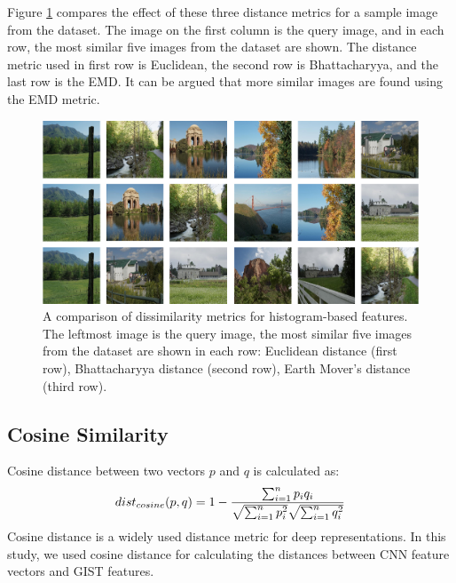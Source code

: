 Figure \ref{fig:sim_comp} compares the effect of these three distance
metrics for a sample image from the dataset. The image
on the first column is the query image, and in each row,
the most similar five images from the dataset are shown.
The distance metric used in first row is Euclidean, the
second row is Bhattacharyya, and the last row is the
EMD. It can be argued that more similar images are
found using the EMD metric.

\begin{figure} 
\centering
\caption{A comparison of dissimilarity metrics for histogram-based features. The leftmost image is the query image, the most similar five images from the dataset are shown in each row: Euclidean distance (first row), Bhattacharyya distance (second row), Earth Mover’s distance (third row).}
\label{fig:sim_comp}
\includegraphics[width=\textwidth]{figures/chapter2/16sims.png}
\vspace{10pt}
\end{figure}

\subsection{Cosine Similarity}
Cosine distance between two vectors $p$ and $q$ is calculated as:
\begin{equation}
dist_{cosine}(p,q) = 1 - {{\sum_{i=1}^{n}p_{i}q_{i}} \over {\sqrt{\sum_{i=1}^{n}p_{i}^2}} \sqrt{\sum_{i=1}^{n}q_{i}^2}} 
\end{equation}
Cosine distance is a widely used distance metric for deep representations. In this study, we used cosine distance for calculating the distances between CNN feature vectors and GIST features.